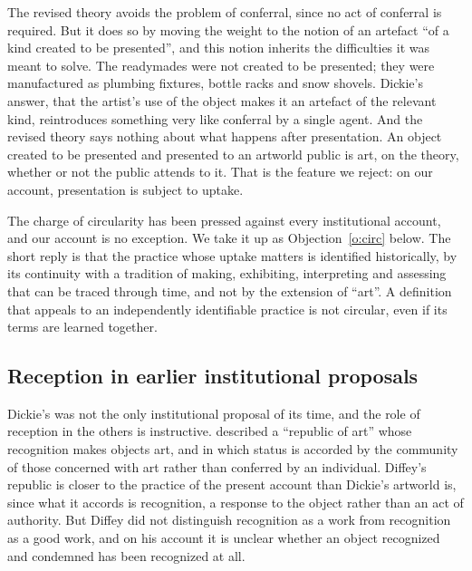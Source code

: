 \documentclass{situationist-preprint}
\begin{document}
The revised theory avoids the problem of conferral, since no act of conferral is required. But it does so by moving the weight to the notion of an artefact \enquote{of a kind created to be presented}, and this notion inherits the difficulties it was meant to solve. The readymades were not created to be presented; they were manufactured as plumbing fixtures, bottle racks and snow shovels. Dickie's answer, that the artist's use of the object makes it an artefact of the relevant kind, reintroduces something very like conferral by a single agent. And the revised theory says nothing about what happens after presentation. An object created to be presented and presented to an artworld public is art, on the theory, whether or not the public attends to it. That is the feature we reject: on our account, presentation is subject to uptake.

The charge of circularity has been pressed against every institutional account, and our account is no exception. We take it up as Objection~\ref{o:circ} below. The short reply is that the practice whose uptake matters is identified historically, by its continuity with a tradition of making, exhibiting, interpreting and assessing that can be traced through time, and not by the extension of \enquote{art}. A definition that appeals to an independently identifiable practice is not circular, even if its terms are learned together.

\subsection{Reception in earlier institutional proposals}

Dickie's was not the only institutional proposal of its time, and the role of reception in the others is instructive. \citet{Diffey1969} described a \enquote{republic of art} whose recognition makes objects art, and in which status is accorded by the community of those concerned with art rather than conferred by an individual. Diffey's republic is closer to the practice of the present account than Dickie's artworld is, since what it accords is recognition, a response to the object rather than an act of authority. But Diffey did not distinguish recognition as a work from recognition as a good work, and on his account it is unclear whether an object recognized and condemned has been recognized at all.
\end{document}

